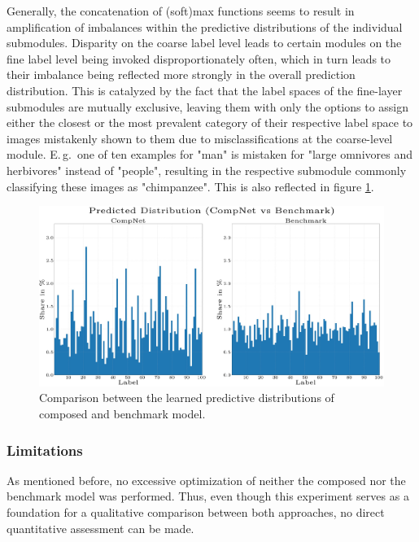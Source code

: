 Generally, the concatenation of (soft)max functions seems to result in amplification of imbalances within the predictive distributions of the individual submodules. Disparity on the coarse label level leads to certain modules on the fine label level being invoked disproportionately often, which in turn leads to their imbalance being reflected more strongly in the overall prediction distribution. This is catalyzed by the fact that the label spaces of the fine-layer submodules are mutually exclusive, leaving them with only the options to assign either the closest or the most prevalent category of their respective label space to images mistakenly shown to them due to misclassifications at the coarse-level module. E.\,g.\ one of ten examples for "man" is mistaken for "large omnivores and herbivores" instead of "people", resulting in the respective submodule commonly classifying these images as "chimpanzee". This is also reflected in figure \ref{fig:experiments_cifar100_results_predictive_distribution_compnet_benchmark}.

\begin{figure}[b!]
    \centering
	    \includegraphics[width=\textwidth, trim=0 0 0 -50, clip]{thesis/graphics/diagrams/cifar100/cifar100_compnet_benchmark_dist_pred_print.jpg}
    \caption{Comparison between the learned predictive distributions of composed and benchmark model.}
    \label{fig:experiments_cifar100_results_predictive_distribution_compnet_benchmark}
\end{figure}

\subsubsection{Limitations%
               \label{sec:experiments_cifar100_limitations}}
               
As mentioned before, no excessive optimization of neither the composed nor the benchmark model was performed. Thus, even though this experiment serves as a foundation for a qualitative comparison between both approaches, no direct quantitative assessment can be made.

